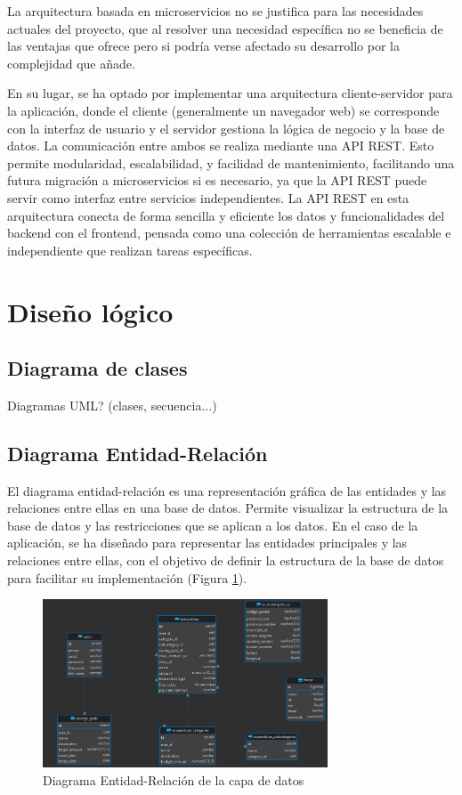 La arquitectura basada en microservicios no se justifica para las necesidades actuales del proyecto, que al resolver una necesidad específica no se beneficia de las ventajas que ofrece pero si podría verse afectado su desarrollo por la complejidad que añade. 

En su lugar, se ha optado por implementar una arquitectura cliente-servidor para la aplicación, donde el cliente (generalmente un navegador web) se corresponde con la interfaz de usuario y el servidor gestiona la lógica de negocio y la base de datos. La comunicación entre ambos se realiza mediante una API REST. Esto permite modularidad, escalabilidad, y facilidad de mantenimiento, facilitando una futura migración a microservicios si es necesario, ya que la API REST puede servir como interfaz entre servicios independientes. La API REST en esta arquitectura conecta de forma sencilla y eficiente los datos y funcionalidades del backend con el frontend, pensada como una colección de herramientas escalable e independiente que realizan tareas específicas. 

\section{Diseño lógico}

\subsection{Diagrama de clases}
Diagramas UML? (clases, secuencia...)

\subsection{Diagrama Entidad-Relación}
El diagrama entidad-relación es una representación gráfica de las entidades y las relaciones entre ellas en una base de datos. Permite visualizar la estructura de la base de datos y las restricciones que se aplican a los datos. En el caso de la aplicación, se ha diseñado para representar las entidades principales y las relaciones entre ellas, con el objetivo de definir la estructura de la base de datos para facilitar su implementación (Figura \ref{fig:diagrama_ER}).

\begin{figure}[ht!]
    \centering
    \includegraphics[height=50mm]{imagenes/diagrama_ER.png}
    \caption{Diagrama Entidad-Relación de la capa de datos}
    \label{fig:diagrama_ER}
\end{figure}


